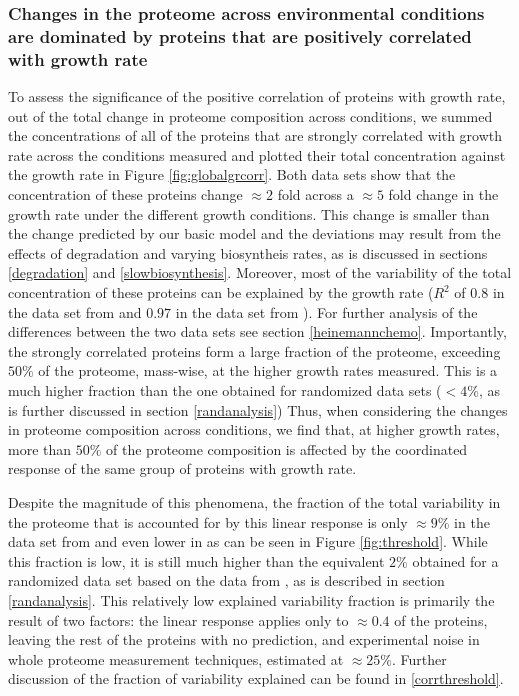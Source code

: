 \documentclass[a4paper]{article}
\newcommand{\hGlobalSumRsq}{0.8}
\newcommand{\vnGlobalSumRsq}{0.97}
\newcommand{\vGlobalSumRsq}{\vnGlobalSumRsq{}}
\begin{document}
\subsubsection{Changes in the proteome across environmental conditions are dominated by proteins that are positively correlated with growth rate}
To assess the significance of the positive correlation of proteins with growth rate, out of the total change in proteome composition across conditions, we summed the concentrations of all of the proteins that are strongly correlated with growth rate across the conditions measured and plotted their total concentration against the growth rate in Figure \ref{fig:globalgrcorr}.
Both data sets show that the concentration of these proteins change $\approx 2$ fold across a $\approx 5$ fold change in the growth rate under the different growth conditions.
This change is smaller than the change predicted by our basic model and the deviations may result from the effects of degradation and varying biosyntheis rates, as is discussed in sections \ref{degradation} and \ref{slowbiosynthesis}.
Moreover, most of the variability of the total concentration of these proteins can be explained by the growth rate ($R^2$ of $\hGlobalSumRsq$ in the data set from \cite{Heinemann2015} and $\vGlobalSumRsq$ in the data set from \cite{Peebo_2015}). 
For further analysis of the differences between the two data sets see section \ref{heinemannchemo}.
Importantly, the strongly correlated proteins form a large fraction of the proteome, exceeding $50\%$ of the proteome, mass-wise, at the higher growth rates measured.
This is a much higher fraction than the one obtained for randomized data sets ($<4\%$, as is further discussed in section \ref{randanalysis})
Thus, when considering the changes in proteome composition across conditions, we find that, at higher growth rates, more than $50\%$ of the proteome composition is affected by the coordinated response of the same group of proteins with growth rate.

Despite the magnitude of this phenomena, the fraction of the total variability in the proteome that is accounted for by this linear response is only $\approx 9\%$  in the data set from \cite{Heinemann2015} and even lower in \cite{Peebo_2015} as can be seen in Figure \ref{fig:threshold}.
While this fraction is low, it is still much higher than the equivalent $2\%$ obtained for a randomized data set based on the data from \cite{Heinemann2015}, as is described in section \ref{randanalysis}.
This relatively low explained variability fraction is primarily the result of two factors: the linear response applies only to $\approx0.4$ of the proteins, leaving the rest of the proteins with no prediction, and experimental noise in whole proteome measurement techniques, estimated at $\approx25\%$.
Further discussion of the fraction of variability explained can be found in \ref{corrthreshold}.
\end{document}
